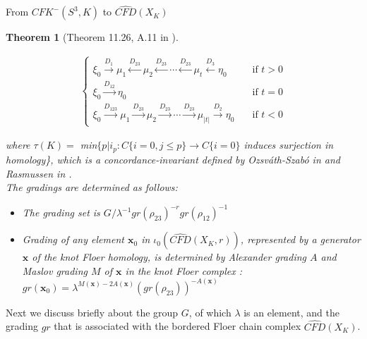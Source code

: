 \documentclass[11pt,reqno]{amsart}
\newtheorem {theorem}{Theorem}
\theoremstyle{definition}
\newtheorem *{remark}{Remark}
\newcommand{\cfdhat}{\widehat{\mathit{CFD}}}
\begin{document}
\begin{subsection}{From $CFK^{-}(S^3,K)$ to $\widehat{CFD}(X_K)$}
\begin{theorem}[Theorem 11.26, A.11 in \cite{lot08}]
\begin{itemize}
\begin{align*}
        \begin{cases}
        \xi_0 \xrightarrow{D_1} \mu_1 \xleftarrow{D_{23}} \mu_2 \xleftarrow{D_{23}} \cdots \xleftarrow{D_{23}} \mu_t \xleftarrow{D_3} \eta_0 & \quad \text{if $t > 0$} \\
        \xi_0 \xrightarrow{D_{12}} \eta_0 & \quad \text{if $t = 0$} \\
        \xi_0 \xrightarrow{D_{123}} \mu_1 \xrightarrow{D_{23}} \mu_2 \xrightarrow{D_{23}} \cdots \xrightarrow{D_{23}} \mu_{|t|} \xrightarrow{D_2} \eta_0 & \quad \text{if $t < 0$}
        \end{cases}
    \end{align*}
\end{itemize}
where $\tau(K) =$ min$\{p| i_p :C\{i=0,j \leq p\} \rightarrow C\{i=0\}$ induces surjection in homology\}, which is a concordance-invariant defined by Ozsv\'ath-Szab\'o in \cite{os4genus03} and Rasmussen in \cite{rasmussen03}. \\
The gradings are determined as follows: 
\begin{itemize}
    \item The grading set is $G / \lambda^{-1} gr(\rho_{23})^{-r}gr(\rho_{12})^{-1}$ 
    \item Grading of any element $\bm{x}_0$ in $\iota_0(\cfdhat(X_K,r))$, represented by a generator $\bm{x}$ of the knot Floer homology, is determined by Alexander grading $A$ and Maslov grading $M$ of $\bm{x}$ in the knot Floer complex : $gr(\bm{x}_0) = \lambda^{M(\bm{x}) - 2A(\bm{x})} (gr(\rho_{23}))^{-A(\bm{x})}$
\end{itemize}
\end{theorem}

\noindent Next we discuss briefly about the group $G$, of which $\lambda$ is an element, and the grading $gr$ that is associated with the
bordered Floer chain complex $\widehat{CFD}(X_K)$. 
     
 \end{subsection}
\end{document}
